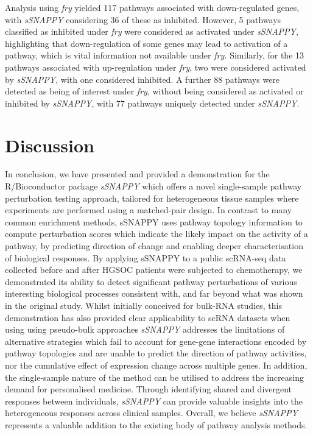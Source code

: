 \documentclass[9pt,a4paper,]{extarticle}
\begin{document}
Analysis using \emph{fry} yielded 117 pathways associated with down-regulated genes, with \emph{sSNAPPY} considering 36 of these as inhibited.
However, 5 pathways classified as inhibited under \emph{fry} were considered as activated under \emph{sSNAPPY}, highlighting that down-regulation of some genes may lead to activation of a pathway, which is vital information not available under \emph{fry.}
Similarly, for the 13 pathways associated with up-regulation under \emph{fry}, two were considered activated by \emph{sSNAPPY}, with one considered inhibited.
A further 88 pathways were detected as being of interest under \emph{fry}, without being considered as activated or inhibited by \emph{sSNAPPY}, with 77 pathways uniquely detected under \emph{sSNAPPY.}

\hypertarget{discussion}{%
\section{Discussion}\label{discussion}}

In conclusion, we have presented and provided a demonstration for the R/Bioconductor package \emph{sSNAPPY} which offers a novel single-sample pathway perturbation testing approach, tailored for heterogeneous tissue samples where experiments are performed using a matched-pair design.
In contrast to many common enrichment methods, sSNAPPY uses pathway topology information to compute perturbation scores which indicate the likely impact on the activity of a pathway, by predicting direction of change and enabling deeper characterisation of biological responses.
By applying sSNAPPY to a public scRNA-seq data collected before and after HGSOC patients were subjected to chemotherapy, we demonstrated its ability to detect significant pathway perturbations of various interesting biological processes consistent with, and far beyond what was shown in the original study.
Whilst initially conceived for bulk-RNA studies, this demonstration has also provided clear applicability to scRNA datasets when using using pseudo-bulk approaches
\emph{sSNAPPY} addresses the limitations of alternative strategies which fail to account for gene-gene interactions encoded by pathway topologies and are unable to predict the direction of pathway activities, nor the cumulative effect of expression change across multiple genes.
In addition, the single-sample nature of the method can be utilised to address the increasing demand for personalised medicine.
Through identifying shared and divergent responses between individuals, \emph{sSNAPPY} can provide valuable insights into the heterogeneous responses across clinical samples.
Overall, we believe \emph{sSNAPPY} represents a valuable addition to the existing body of pathway analysis methods.
\end{document}
